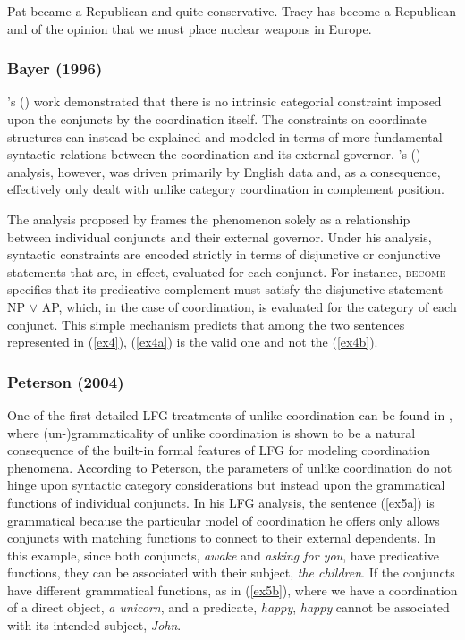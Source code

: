 \pex
\label{ex4}
\a\label{ex4a}Pat became a Republican and quite conservative. 
\a\label{ex4b}\ljudge{*}Tracy has become a Republican and of the opinion that we
must place nuclear weapons in Europe. 
\xe

\subsubsection{Bayer (1996)}
\citeauthor{sagetal1985}'s (\citeyear{sagetal1985}) work demonstrated that there is no intrinsic categorial constraint imposed upon the conjuncts by the coordination itself. The constraints on coordinate structures can instead be explained and modeled in terms of more fundamental syntactic relations between the coordination and its external governor. \citeauthor{sagetal1985}'s (\citeyear{sagetal1985}) analysis, however, was driven primarily by English data and, as a consequence, effectively only dealt with unlike category coordination in complement position. 

The analysis proposed by \citet{bayer1996} frames the phenomenon solely as a relationship between individual conjuncts and their external governor. Under his analysis, syntactic constraints are encoded strictly in terms of disjunctive or conjunctive statements that are, in effect, evaluated for each conjunct. For instance, \textsc{become} specifies that its predicative complement must satisfy the disjunctive statement NP $\lor$ AP, which, in the case of coordination, is evaluated for the category of each conjunct. This simple mechanism predicts that among the two sentences represented in (\ref{ex4}), (\ref{ex4a}) is the valid one and not the (\ref{ex4b}).

\subsubsection{Peterson (2004)}
One of the first detailed LFG treatments of unlike coordination can be found in \citet{peterson2004}, where (un-)gram\-maticality of unlike coordination is shown to be a natural consequence of the built-in formal features of LFG for modeling coordination phenomena. According to Peterson, the parameters of unlike coordination do not hinge upon syntactic category considerations but instead upon the grammatical functions of individual conjuncts. In his LFG analysis, the sentence (\ref{ex5a}) is grammatical because the particular model of coordination he offers only allows conjuncts with matching functions to connect to their external dependents. In this example, since both conjuncts, \textit{awake} and \textit{asking for you}, have predicative functions, they can be associated with their subject, \textit{the children}. If the conjuncts have different grammatical functions, as in (\ref{ex5b}), where we have a coordination of a direct object, \textit{a unicorn}, and a predicate, \textit{happy}, \textit{happy} cannot be associated with its intended subject, \textit{John}.

